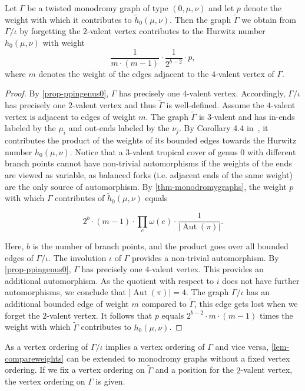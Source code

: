 \documentclass[ALCO,published]{cedram}
\DeclareMathOperator{\Aut}{Aut}
\begin{document}
\begin{lemma}\label{lem-compareweights}
Let $\Gamma$ be a twisted monodromy graph of type $(0,\mu,\nu)$ and let $p$ denote the weight with which it contributes to $\tilde{h}_0(\mu,\nu)$. 
Then the graph $\tilde{\Gamma}$ we obtain from $\Gamma/\iota$ by forgetting the $2$-valent vertex contributes to the Hurwitz number $h_0(\mu,\nu)$ with weight
$$\frac{1}{m\cdot(m-1)} \cdot \frac{1}{2^{b-2}}\cdot p,$$
where $m$ denotes the weight of the edges adjacent to the $4$-valent vertex of $\Gamma$.

\end{lemma}
\begin{proof}
By \cref{prop-ppingenus0}, $\Gamma$ has precisely one $4$-valent vertex. Accordingly, $\Gamma/\iota$ has precisely one $2$-valent vertex and thus $\tilde{\Gamma}$ is well-defined.
Assume the $4$-valent vertex is adjacent to edges of weight $m$.
The graph $\tilde{\Gamma}$ is $3$-valent and has in-ends labeled by the $\mu_i$ and out-ends labeled by the $\nu_j$. By Corollary 4.4 in~\cite{CJM10}, it contributes the product of the weights of its bounded edges towards the Hurwitz number $h_0(\mu,\nu)$. Notice that a $3$-valent tropical cover of genus $0$ with different branch points cannot have non-trivial automorphisms if the weights of the ends are viewed as variable, as balanced forks (i.e. adjacent ends of the same weight) are the only source of automorphism.
By \cref{thm-monodromygraphs}, the weight $p$ with which $\Gamma$ contributes of $\tilde{h}_0(\mu,\nu)$ equals 

$$2^{b}\cdot (m-1)\cdot\prod_e\omega(e)\cdot \frac{1}{|\Aut(\pi)|}.$$

Here, $b$ is the number of branch points, and the product goes over all bounded edges of $\Gamma/\iota$.
The involution $\iota$ of $\Gamma$ provides a non-trivial automorphism. By \cref{prop-ppingenus0}, $\Gamma$ has precisely one $4$-valent vertex. This provides an additional automorphism. As the quotient with respect to $i$ does not have further automorphisms, we conclude that $|\Aut(\pi)|=4$.
The graph $\Gamma/\iota$ has an additional bounded edge of weight $m$ compared to $\tilde{\Gamma}$, this edge gets lost when we forget the $2$-valent vertex.
It follows that $p$ equals
$2^{b-2}\cdot m \cdot (m-1)$ times the weight with which $\tilde{\Gamma}$ contributes to $h_0(\mu,\nu)$.
\end{proof}

\begin{rema}
As a vertex ordering of $\Gamma/\iota$ implies a vertex ordering of $\Gamma$ and vice versa, \cref{lem-compareweights} can be extended to monodromy graphs without a fixed vertex ordering. If we fix a vertex ordering on $\tilde{\Gamma}$ and a position for the $2$-valent vertex, the vertex ordering on $\Gamma$ is given.
\end{rema}
\end{document}
